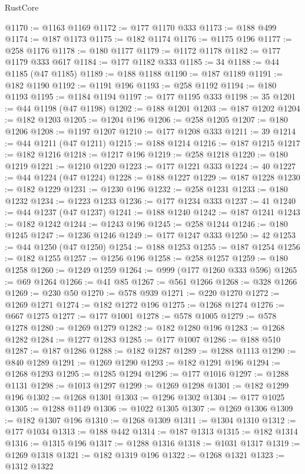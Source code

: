 \begin{lexlean}{RustCore}
\begin{coremodule}
@1170 := @1163 @1169
@1172 := @177 @1170 @333
@1173 := @188 @499
@1174 := @187 @1173
@1175 := @182 @1174
@1176 := @1175 @196
@1177 := @258 @1176
@1178 := @180 @1177
@1179 := @1172 @1178
@1182 := @177 @1179 @333 @617
@1184 := @177 @1182 @333
@1185 := 34
@1188 := @44 @1185 (@47 @1185)
@1189 := @188 @1188
@1190 := @187 @1189
@1191 := @182 @1190
@1192 := @1191 @196
@1193 := @258 @1192
@1194 := @180 @1193
@1195 := @1184 @1194
@1197 := @177 @1195 @333
@1198 := 35
@1201 := @44 @1198 (@47 @1198)
@1202 := @188 @1201
@1203 := @187 @1202
@1204 := @182 @1203
@1205 := @1204 @196
@1206 := @258 @1205
@1207 := @180 @1206
@1208 := @1197 @1207
@1210 := @177 @1208 @333
@1211 := 39
@1214 := @44 @1211 (@47 @1211)
@1215 := @188 @1214
@1216 := @187 @1215
@1217 := @182 @1216
@1218 := @1217 @196
@1219 := @258 @1218
@1220 := @180 @1219
@1221 := @1210 @1220
@1223 := @177 @1221 @333
@1224 := 40
@1227 := @44 @1224 (@47 @1224)
@1228 := @188 @1227
@1229 := @187 @1228
@1230 := @182 @1229
@1231 := @1230 @196
@1232 := @258 @1231
@1233 := @180 @1232
@1234 := @1223 @1233
@1236 := @177 @1234 @333
@1237 := 41
@1240 := @44 @1237 (@47 @1237)
@1241 := @188 @1240
@1242 := @187 @1241
@1243 := @182 @1242
@1244 := @1243 @196
@1245 := @258 @1244
@1246 := @180 @1245
@1247 := @1236 @1246
@1249 := @177 @1247 @333
@1250 := 42
@1253 := @44 @1250 (@47 @1250)
@1254 := @188 @1253
@1255 := @187 @1254
@1256 := @182 @1255
@1257 := @1256 @196
@1258 := @258 @1257
@1259 := @180 @1258
@1260 := @1249 @1259
@1264 := @999 (@177 @1260 @333 @596)
@1265 := @69 @1264
@1266 := @41 @85
@1267 := @561 @1266
@1268 := @328 @1266
@1269 := @230 @50
@1270 := @578 @939
@1271 := @220 @1270
@1272 := @1269 @1271
@1274 := @182 @1272 @196
@1275 := @1268 @1274
@1276 := @667 @1275
@1277 := @177 @1001
@1278 := @578 @1005
@1279 := @578 @1278
@1280 := @1269 @1279
@1282 := @182 @1280 @196
@1283 := @1268 @1282
@1284 := @1277 @1283
@1285 := @177 @1007
@1286 := @188 @510
@1287 := @187 @1286
@1288 := @182 @1287
@1289 := @1288 @1113
@1290 := @840 @1289
@1291 := @1269 @1290
@1293 := @182 @1291 @196
@1294 := @1268 @1293
@1295 := @1285 @1294
@1296 := @177 @1016
@1297 := @1288 @1131
@1298 := @1013 @1297
@1299 := @1269 @1298
@1301 := @182 @1299 @196
@1302 := @1268 @1301
@1303 := @1296 @1302
@1304 := @177 @1025
@1305 := @1288 @1149
@1306 := @1022 @1305
@1307 := @1269 @1306
@1309 := @182 @1307 @196
@1310 := @1268 @1309
@1311 := @1304 @1310
@1312 := @177 @1034
@1313 := @188 @442
@1314 := @187 @1313
@1315 := @182 @1314
@1316 := @1315 @196
@1317 := @1288 @1316
@1318 := @1031 @1317
@1319 := @1269 @1318
@1321 := @182 @1319 @196
@1322 := @1268 @1321
@1323 := @1312 @1322

\end{coremodule}
\end{lexlean}
